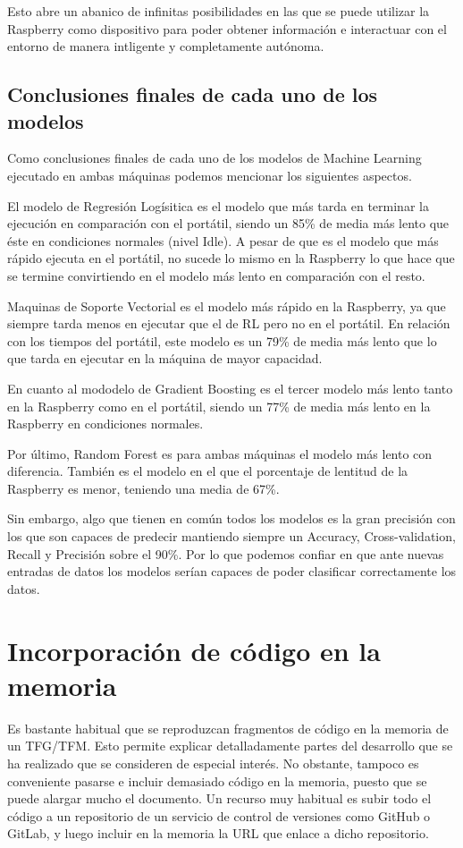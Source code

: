 \documentclass[a4paper, 12pt]{book}
\begin{document}
Esto abre un abanico de infinitas posibilidades en las que se puede utilizar la Raspberry como dispositivo para poder obtener información e interactuar con el entorno de manera intligente y completamente autónoma.

\subsection{Conclusiones finales de cada uno de los modelos}

Como conclusiones finales de cada uno de los modelos de Machine Learning ejecutado en ambas máquinas podemos mencionar los siguientes aspectos.

El modelo de Regresión Logísitica es el modelo que más tarda en terminar la ejecución en comparación con el portátil, siendo un 85\% de media más lento que éste en condiciones normales (nivel Idle). A pesar de que es el modelo que más rápido ejecuta en el portátil, no sucede lo mismo en la Raspberry lo que hace que se termine convirtiendo en el modelo más lento en comparación con el resto. 

Maquinas de Soporte Vectorial es el modelo más rápido en la Raspberry, ya que siempre tarda menos en ejecutar que el de RL pero no en el portátil. En relación con los tiempos del portátil, este modelo es un 79\% de media más lento que lo que tarda en ejecutar en la máquina de mayor capacidad.

En cuanto al mododelo de Gradient Boosting es el tercer modelo más lento tanto en la Raspberry como en el portátil, siendo un 77\% de media más lento en la Raspberry en condiciones normales.

Por último, Random Forest es para ambas máquinas el modelo más lento con diferencia. También es el modelo en el que el porcentaje de lentitud de la Raspberry es menor, teniendo una media de 67\%.

Sin embargo, algo que tienen en común todos los modelos es la gran precisión con los que son capaces de predecir mantiendo siempre un Accuracy, Cross-validation, Recall y Precisión sobre el 90\%. Por lo que podemos confiar en que ante nuevas entradas de datos los modelos serían capaces de poder clasificar correctamente los datos.
 
\section{Incorporación de código en la memoria}

Es bastante habitual que se reproduzcan fragmentos de código en la memoria de un TFG/TFM.
Esto permite explicar detalladamente partes del desarrollo que se ha realizado que se consideren
de especial interés. No obstante, tampoco es conveniente pasarse e incluir demasiado código en
la memoria, puesto que se puede alargar mucho el documento. Un recurso muy habitual es subir
todo el código a un repositorio de un servicio de control de versiones como GitHub o GitLab,
y luego incluir en la memoria la URL que enlace a dicho repositorio.
\end{document}
